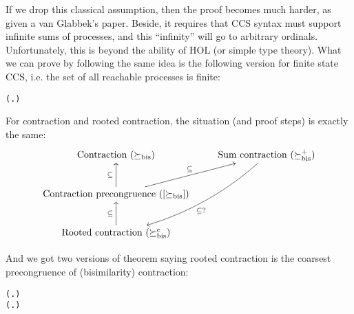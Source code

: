 \documentclass{eptcs} %
\theoremstyle{definition}
\theoremstyle{proposition}
\begin{document}
If we drop this classical assumption, then the proof becomes much
harder, as given a van Glabbek's paper. Beside, it requires that CCS
syntax must support infinite sums of processes, and this ``infinity''
will go to arbitrary ordinals. Unfortunately, this is beyond the
ability of HOL (or simple type theory). What we can prove by following
the same idea is the following version for finite state CCS, i.e. the
set of all reachable processes is finite:
\begin{alltt}
\HOLTokenTurnstile{}   \HOLSymConst{\HOLTokenConj{}}   \HOLSymConst{\HOLTokenImp{}}
   ( \HOLSymConst{\HOLTokenObsCongr}  \HOLSymConst{\HOLTokenEquiv{}} \HOLSymConst{\HOLTokenForall{}}.  \HOLSymConst{+}  \HOLSymConst{\HOLTokenWeakEQ}  \HOLSymConst{+} )
\end{alltt}

For contraction and rooted contraction, the situation (and proof
steps) is exactly the same:
\begin{displaymath}
\xymatrix{
{\textrm{Contraction } (\succeq_{\mathrm{bis}})} & {\textrm{Sum
    contraction } (\succeq_{\mathrm{bis}}^+)} \ar@/^3ex/[ldd]^{\subseteq ?}\\
{\textrm{Contraction precongruence } ([\succeq_{\mathrm{bis}}])}
\ar[u]^{\subseteq} \ar[ru]^{\subseteq} \\
{\textrm{Rooted contraction } (\succeq_{\mathrm{bis}}^c)} \ar[u]^{\subseteq}
}
\end{displaymath}

And we got two versions of theorem saying rooted contraction is the
coarsest precongruence of (bisimilarity) contraction:
\begin{alltt}
\HOLTokenTurnstile{}   \HOLSymConst{\HOLTokenConj{}}   \HOLSymConst{\HOLTokenImp{}}
   ( \HOLSymConst{\HOLTokenObsContracts}  \HOLSymConst{\HOLTokenEquiv{}} \HOLSymConst{\HOLTokenForall{}}.  \HOLSymConst{+}  \HOLSymConst{\HOLTokenContracts{}}  \HOLSymConst{+} )
\HOLTokenTurnstile{}   \HOLSymConst{\HOLTokenConj{}}   \HOLSymConst{\HOLTokenImp{}}
   ( \HOLSymConst{\HOLTokenObsContracts}  \HOLSymConst{\HOLTokenEquiv{}} \HOLSymConst{\HOLTokenForall{}}.  \HOLSymConst{+}  \HOLSymConst{\HOLTokenContracts{}}  \HOLSymConst{+} )
\end{alltt}
\end{document}
